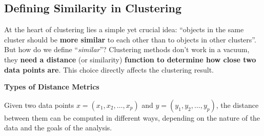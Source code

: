 \subsection{Defining Similarity in Clustering}

At the heart of clustering lies a simple yet crucial idea: ``objects in the same cluster should be \textbf{more similar} to each other than to objects in other clusters''. But how do we define ``\emph{similar}''? Clustering methods don't work in a vacuum, they \textbf{need a distance} (or similarity) \textbf{function to determine how close two data points are}. This choice directly affects the clustering result.

\highspace
\begin{flushleft}
    \textcolor{Green3}{ \textbf{Types of Distance Metrics}}
\end{flushleft}
Given two data points $x = \left(x_{1}, x_{2}, \dots, x_{p}\right)$ and $y = \left(y_{1}, y_{2}, \dots, y_{p}\right)$, the distance between them can be computed in different ways, depending on the nature of the data and the goals of the analysis.
